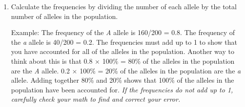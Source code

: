 \documentclass[12pt]{exam}
\newcommand{\allele}[1]{\textit{#1}}
\begin{document}
\begin{enumerate}
	\item Calculate the frequencies by dividing the number of each allele by the total number of alleles in the population.
	
	Example: The frequency of the \allele{A} allele is 160/200 = 0.8. The frequency of the \allele{a} allele is 40/200 = 0.2.  The frequencies must add up to 1 to show that you have accounted for all of the alleles in the population. Another way to think about this is that 0.8 $\times$ 100\% = 80\% of the alleles in the population are the \allele{A} allele. 0.2 $\times$ 100\% = 20\% of the alleles in the population are the \allele{a} allele. Adding together 80\% and 20\% shows that 100\% of the alleles in the population have been accounted for. \emph{If the frequencies do not add up to 1, carefully check your math to find and correct your error.}
	
\end{enumerate}
\end{document}
